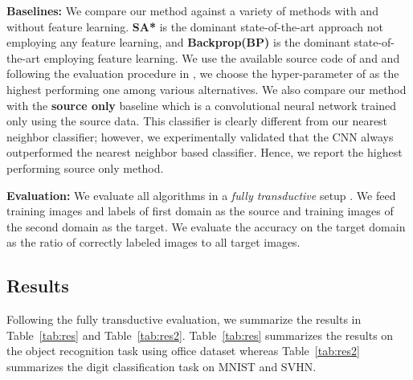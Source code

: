 \vspace{2mm}
\noindent \textbf{Baselines:} We compare our method against a variety of methods with and without feature learning. \textbf{SA*}\cite{fernando13} is the dominant state-of-the-art approach not employing any feature learning, and \textbf{Backprop(BP)}\cite{ganin15} is the dominant state-of-the-art employing feature learning. We use the available source code of \cite{ganin15} and \cite{fernando13} and following the evaluation procedure in \cite{ganin15}, we choose the hyper-parameter of \cite{fernando13} as the highest performing one among various alternatives. We also compare our method with the \textbf{source only} baseline which is a convolutional neural network trained only using the source data. This classifier is clearly different from our nearest neighbor classifier; however, we experimentally validated that the CNN always outperformed the nearest neighbor based classifier. Hence, we report the highest performing source only method.

\vspace{2mm}
\noindent \textbf{Evaluation:} We evaluate all algorithms in a \emph{fully transductive} setup \cite{gong2012}.  We feed training images and labels of first domain as the source and training images of the second domain as the target. We evaluate the accuracy on the target domain as the ratio of correctly labeled images to all target images.



\subsection{Results}
Following the fully transductive evaluation, we summarize the results in Table~\ref{tab:res} and Table~\ref{tab:res2}. Table~\ref{tab:res} summarizes the results on the object recognition task using office dataset whereas  Table~\ref{tab:res2} summarizes the digit classification task on MNIST and SVHN.

